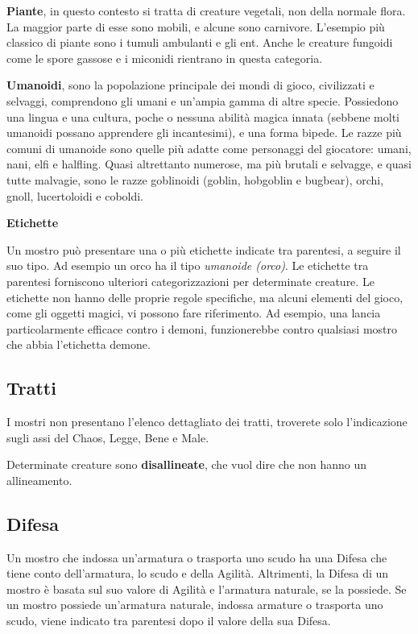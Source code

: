 \begin{multicols}{2}
\medskip\textbf{Piante}, in questo contesto si tratta di creature vegetali, non della normale flora. La maggior parte di esse sono mobili, e alcune sono carnivore. L'esempio più classico di piante sono i tumuli ambulanti e gli ent. Anche le creature fungoidi come le spore gassose e i miconidi rientrano in questa categoria.

\medskip\textbf{Umanoidi}, sono la popolazione principale dei mondi di gioco, civilizzati e selvaggi, comprendono gli umani e un'ampia gamma di altre specie. Possiedono una lingua e una cultura, poche o nessuna abilità magica innata (sebbene molti umanoidi possano apprendere gli incantesimi), e una forma bipede. Le razze più comuni di umanoide sono quelle più adatte come personaggi del giocatore: umani, nani, elfi e halfling. Quasi altrettanto numerose, ma più brutali e selvagge, e quasi tutte malvagie, sono le razze goblinoidi (goblin, hobgoblin e bugbear), orchi, gnoll, lucertoloidi e coboldi.

\medskip\textbf{Etichette}

Un mostro può presentare una o più etichette indicate tra parentesi, a seguire il suo tipo. Ad esempio un orco ha il tipo \emph{umanoide (orco)}. Le etichette tra parentesi forniscono ulteriori categorizzazioni per determinate creature. Le etichette non hanno delle proprie regole specifiche, ma alcuni elementi del gioco, come gli oggetti magici, vi possono fare riferimento. Ad esempio, una lancia particolarmente efficace contro i demoni, funzionerebbe contro qualsiasi mostro che abbia l'etichetta demone.

\subsection{Tratti}

I mostri non presentano l'elenco dettagliato dei tratti, troverete solo l'indicazione sugli assi del Chaos, Legge, Bene e Male.

Determinate creature  sono \textbf{disallineate}, che vuol dire che non hanno un allineamento.

\subsection{Difesa}

Un mostro che indossa un'armatura o trasporta uno scudo ha una Difesa che tiene conto dell'armatura, lo scudo e della Agilità. Altrimenti, la Difesa di un mostro è basata sul suo valore di Agilità e l'armatura naturale, se la possiede. Se un mostro possiede un'armatura naturale, indossa armature o trasporta uno scudo, viene indicato tra parentesi dopo il valore della sua Difesa.


\end{multicols}
